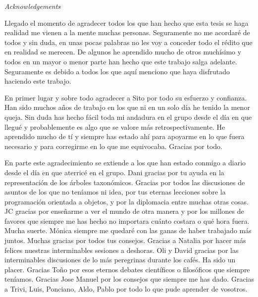 \newcommand\acknowledgements[1]{
\btypeout{Acknowledgements}
\addtotoc{Acknowledgements}
\thispagestyle{plain}
\begin{center}{\huge{\textit{Acknowledgements}} \par}\end{center}
{\normalsize #1}
\vfil\vfil\null
}

\acknowledgements{

Llegado el momento de agradecer todos los que han hecho que esta tesis se haga realidad me vienen a la mente muchas personas. Seguramente no me acordaré de todos y sin duda, en unas pocas palabras no les voy a conceder todo el rédito que en realidad se merecen. De algunos he aprendido mucho de otros muchísimo y todos en un mayor o menor parte han hecho que este trabajo salga adelante. Seguramente es debido a todos los que aquí menciono que haya disfrutado haciendo este trabajo.

 En primer lugar y sobre todo agradecer a Sito por todo su esfuerzo y confianza. Han sido muchos años de trabajo en los que ni en un solo día he tenido la menor queja. Sin duda has hecho fácil toda mi andadura en el grupo desde el día en que llegué y probablemente es algo que se valore más retrospectivamente. He aprendido mucho de tí y siempre has estado ahí para apoyarme en lo que fuera necesario y para corregirme en lo que me equivocaba. Gracias por todo.

En parte este agradecimiento se extiende a los que han estado conmigo a diario desde el día en que aterricé en el grupo. Dani gracias por tu ayuda en la representación de los árboles taxonómicos. Gracias por todos las discusiones de asuntos de los que no teníamos ni idea, por tus eternas lecciones sobre la programación orientada a objetos, y por la diplomacia entre muchas otras cosas. JC gracias por enseñarme a ver el mundo de otra manera y por los millones de favores que siempre me has hecho no importara cuánto costara o qué hora fuera. Mucha suerte. Mónica siempre me quedaré con las ganas de haber trabajado más juntos. Muchas gracias por todos tus consejos. Gracias a Natalia por hacer más felices nuestras interminables sesiones a deshoras. Oli y David gracias por las interminables discusiones de lo más peregrinas durante los cafés. Ha sido un placer. Gracias Toño por esos eternos debates científicos o filosóficos que siempre teníamos. Gracias Jose Manuel por los consejos que siempre me has dado. Gracias a Trivi, Luis, Ponciano, Aldo, Pablo por todo lo que pude aprender de vosotros.

}

